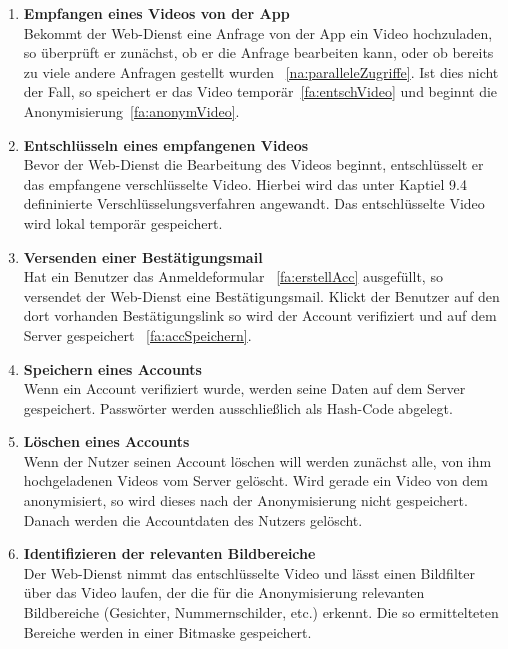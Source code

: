 \begin{enumerate}
\renewcommand{\labelenumi}{\textbf{\theenumi}}
\renewcommand{\theenumi}{FA\arabic{enumi}0}
\setcounter{enumi}{199}

\item  \textbf{Empfangen eines Videos von der \gls{App}} \hfill \\
Bekommt der \gls{Web-Dienst} eine Anfrage von der App ein Video hochzuladen, so überprüft er zunächst, ob er die Anfrage bearbeiten kann, oder ob bereits zu viele andere Anfragen gestellt wurden ~\eqref{na:paralleleZugriffe}. Ist dies nicht der Fall, so speichert er das Video temporär~\eqref{fa:entschVideo} und beginnt die Anonymisierung~\eqref{fa:anonymVideo}.

\item  \label{fa:entschVideo}\textbf{Entschlüsseln eines empfangenen Videos} \hfill \\
Bevor der \gls{Web-Dienst} die Bearbeitung des Videos beginnt, entschlüsselt er das empfangene verschlüsselte Video. Hierbei wird das unter Kaptiel 9.4 defininierte Verschlüsselungsverfahren angewandt. Das entschlüsselte Video wird lokal temporär gespeichert.

\item \label{fa:mailSenden}\textbf{Versenden einer Bestätigungsmail} \hfill \\
Hat ein Benutzer das Anmeldeformular ~\eqref{fa:erstellAcc} ausgefüllt, so versendet der \gls{Web-Dienst} eine Bestätigungsmail. Klickt der Benutzer auf den dort vorhanden Bestätigungslink so wird der Account verifiziert und auf dem Server gespeichert ~\eqref{fa:accSpeichern}.

\item \label{fa:accSpeichern}\textbf{Speichern eines Accounts} \hfill \\
Wenn ein Account verifiziert wurde, werden seine Daten auf dem Server gespeichert. Passwörter werden ausschließlich als \gls{Hash-Code} abgelegt.

\item \label{fa:accLöschen}\textbf{Löschen eines Accounts} \hfill \\
Wenn der Nutzer seinen Account löschen will werden zunächst alle, von ihm hochgeladenen Videos vom Server gelöscht. Wird gerade ein Video von dem anonymisiert, so wird dieses nach der Anonymisierung nicht gespeichert. Danach werden die Accountdaten des Nutzers gelöscht.

\item  \label{fa:relBildbereiche}\textbf{Identifizieren der relevanten Bildbereiche} \hfill \\
Der \gls{Web-Dienst} nimmt das entschlüsselte Video und lässt einen Bildfilter über das Video laufen, der die für die Anonymisierung relevanten Bildbereiche (Gesichter, Nummernschilder, etc.) erkennt. Die so ermittelteten Bereiche werden in einer Bitmaske gespeichert.


\end{enumerate}
